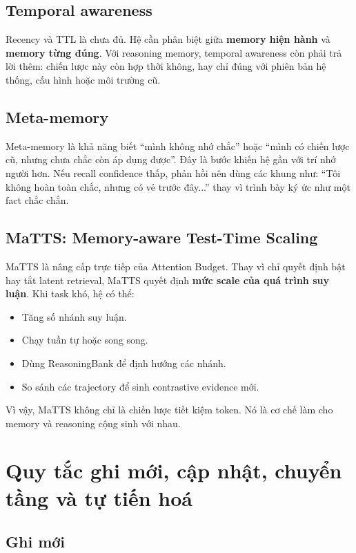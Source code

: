 \documentclass[a4paper,12pt]{article}
\begin{document}
\subsection*{Temporal awareness}

Recency và TTL là chưa đủ. Hệ cần phân biệt giữa \textbf{memory hiện hành} và \textbf{memory từng đúng}. Với reasoning memory, temporal awareness còn phải trả lời thêm: chiến lược này còn hợp thời không, hay chỉ đúng với phiên bản hệ thống, cấu hình hoặc môi trường cũ.

\subsection*{Meta-memory}

Meta-memory là khả năng biết ``mình không nhớ chắc'' hoặc ``mình có chiến lược cũ, nhưng chưa chắc còn áp dụng được''. Đây là bước khiến hệ gần với trí nhớ người hơn. Nếu recall confidence thấp, phản hồi nên dùng các khung như: ``Tôi không hoàn toàn chắc, nhưng có vẻ trước đây...'' thay vì trình bày ký ức như một fact chắc chắn.

\subsection*{MaTTS: Memory-aware Test-Time Scaling}

MaTTS là nâng cấp trực tiếp của Attention Budget. Thay vì chỉ quyết định bật hay tắt latent retrieval, MaTTS quyết định \textbf{mức scale của quá trình suy luận}. Khi task khó, hệ có thể:
\begin{itemize}
    \item Tăng số nhánh suy luận.
    \item Chạy tuần tự hoặc song song.
    \item Dùng ReasoningBank để định hướng các nhánh.
    \item So sánh các trajectory để sinh contrastive evidence mới.
\end{itemize}

Vì vậy, MaTTS không chỉ là chiến lược tiết kiệm token. Nó là cơ chế làm cho memory và reasoning cộng sinh với nhau.

\section{Quy tắc ghi mới, cập nhật, chuyển tầng và tự tiến hoá}

\subsection*{Ghi mới}
\end{document}
